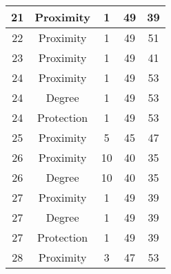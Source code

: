 \documentclass[results.tex]{subfiles}
\begin{document}
\begin{center}
\begin{tabular}{| c || c | c | c | c |}
            \hline
            21                      & Proximity                    & 1                      & 49                      & 39                   \\
            \hline
            22                      & Proximity                    & 1                      & 49                      & 51                   \\
            \hline
            23                      & Proximity                    & 1                      & 49                      & 41                   \\
            \hline
            24                      & Proximity                    & 1                      & 49                      & 53                   \\
            \hline
            24                      & Degree                       & 1                      & 49                      & 53                   \\
            \hline
            24                      & Protection                   & 1                      & 49                      & 53                   \\
            \hline
            25                      & Proximity                    & 5                      & 45                      & 47                   \\
            \hline
            26                      & Proximity                    & 10                     & 40                      & 35                   \\
            \hline
            26                      & Degree                       & 10                     & 40                      & 35                   \\
            \hline
            27                      & Proximity                    & 1                      & 49                      & 39                   \\
            \hline
            27                      & Degree                       & 1                      & 49                      & 39                   \\
            \hline
            27                      & Protection                   & 1                      & 49                      & 39                   \\
            \hline
            28                      & Proximity                    & 3                      & 47                      & 53                   \\

\end{tabular}
\end{center}
\end{document}
